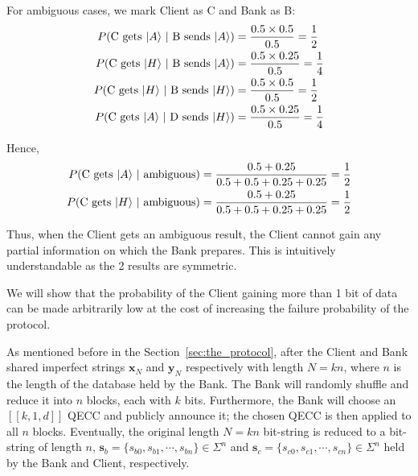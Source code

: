 \documentclass[%
 reprint,
superscriptaddress,
 amsmath,amssymb,
 aps,
]{revtex4-2}
\begin{document}
For ambiguous cases, we mark Client as C and Bank as B:
\begin{equation}
    \begin{split}
        P(\text{C gets $\ket{A}$ $|$ B sends $\ket{A}$})&=\frac{0.5\times 0.5}{0.5}=\frac{1}{2}\\
        P(\text{C gets $\ket{H}$ $|$ B sends $\ket{A}$})&=\frac{0.5\times 0.25}{0.5}=\frac{1}{4}\\
        P(\text{C gets $\ket{H}$ $|$ B sends $\ket{H}$})&=\frac{0.5\times 0.5}{0.5}=\frac{1}{2}\\
        P(\text{C gets $\ket{A}$ $|$ D sends $\ket{H}$})&=\frac{0.5\times 0.25}{0.5}=\frac{1}{4}\\
    \end{split}
\end{equation}

Hence, 
\begin{equation}
    \begin{split}
        P(\text{C gets $\ket{A}$ $|$ ambiguous})&=\frac{0.5+0.25}{0.5+0.5+0.25+0.25}=\frac{1}{2}\\
        P(\text{C gets $\ket{H}$ $|$ ambiguous})&=\frac{0.5+0.25}{0.5+0.5+0.25+0.25}=\frac{1}{2}\\
    \end{split}
\end{equation}

Thus, when the Client gets an ambiguous result, the Client cannot gain any partial information on which the Bank prepares. This is intuitively understandable as the 2 results are symmetric. 

We will show that the probability of the Client gaining more than 1 bit of data can be made arbitrarily low at the cost of increasing the failure probability of the protocol.

As mentioned before in the Section~\ref{sec:the_protocol}, after the Client and Bank shared imperfect strings $\textbf{x}_N$ and $\textbf{y}_N$ respectively with length $N=kn$, where $n$ is the length of the database held by the Bank. The Bank will randomly shuffle and reduce it into $n$ blocks, each with $k$ bits. Furthermore, the Bank will choose an $[[k, 1, d]]$ QECC and publicly announce it; the chosen QECC is then applied to all $n$ blocks. Eventually, the original length $N=kn$ bit-string is reduced to a bit-string of length $n$, $\textbf{s}_b=\{s_{b0}, s_{b1}, \cdots, s_{bn}\}\in\Sigma^n$ and $\textbf{s}_c=\{s_{c0}, s_{c1}, \cdots, s_{cn}\}\in\Sigma^n$ held by the Bank and Client, respectively. 
\end{document}
